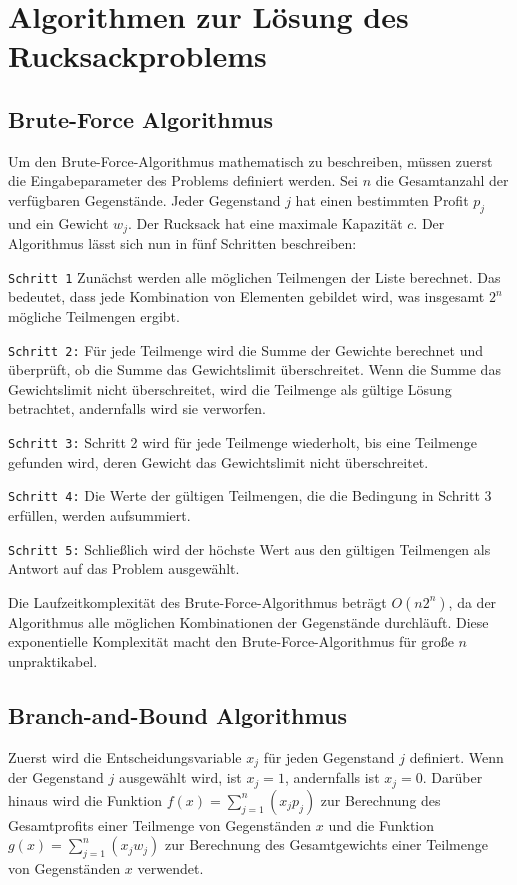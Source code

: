 

\newcommand*{\dpd}{\ensuremath{\mathit{dp}}}

\chapter{Algorithmen zur Lösung des Rucksackproblems}
\section{Brute-Force Algorithmus}
Um den Brute-Force-Algorithmus mathematisch zu beschreiben, 
müssen zuerst die Eingabeparameter des Problems definiert werden. Sei 
$n$ die Gesamtanzahl der verfügbaren Gegenstände. Jeder 
Gegenstand $j$ hat einen bestimmten Profit $p_j$ und ein Gewicht $w_j$. 
Der Rucksack hat eine maximale Kapazität $c$.
Der Algorithmus lässt sich nun in fünf Schritten beschreiben:

\texttt{Schritt 1}
Zunächst werden alle möglichen Teilmengen der Liste berechnet. 
Das bedeutet, dass jede Kombination von Elementen gebildet 
wird, was insgesamt $2^n$ mögliche Teilmengen ergibt.

\texttt{Schritt 2:}
Für jede Teilmenge wird die Summe der Gewichte berechnet und 
überprüft, ob die Summe das Gewichtslimit  
überschreitet. Wenn die Summe das Gewichtslimit nicht 
überschreitet, wird die Teilmenge als gültige Lösung 
betrachtet, andernfalls wird sie verworfen.

\texttt{Schritt 3:}
Schritt 2 wird für jede Teilmenge wiederholt, bis eine 
Teilmenge gefunden wird, deren Gewicht das Gewichtslimit 
nicht überschreitet.

\texttt{Schritt 4:}
Die Werte der gültigen Teilmengen, die die Bedingung in 
Schritt 3 erfüllen, werden aufsummiert.

\texttt{Schritt 5:}
Schließlich wird der höchste Wert aus den gültigen 
Teilmengen als Antwort auf das Problem ausgewählt.\ \cite[vgl.][]{balogun2022explanatory}

Die Laufzeitkomplexität des Brute-Force-Algorithmus beträgt 
$O(n2^n)$, da der Algorithmus alle möglichen Kombinationen der 
Gegenstände durchläuft. Diese exponentielle Komplexität 
macht den Brute-Force-Algorithmus für große $n$ unpraktikabel.\ \cite[vgl.][]{hristakeva2005different}

\section{Branch-and-Bound Algorithmus}
Zuerst wird die Entscheidungsvariable $x_j$ für jeden 
Gegenstand $j$ definiert. Wenn der Gegenstand $j$ ausgewählt wird, ist $x_j = 1$, 
andernfalls ist $x_j = 0$. Darüber hinaus 
wird die Funktion $f(x) = \sum_{j=1}^{n}(x_j  p_j)$ zur Berechnung des 
Gesamtprofits einer Teilmenge von Gegenständen $x$ und die 
Funktion $g(x) = \sum_{j=1}^{n}(x_j w_j)$ zur Berechnung des Gesamtgewichts einer 
Teilmenge von Gegenständen $x$ verwendet.

